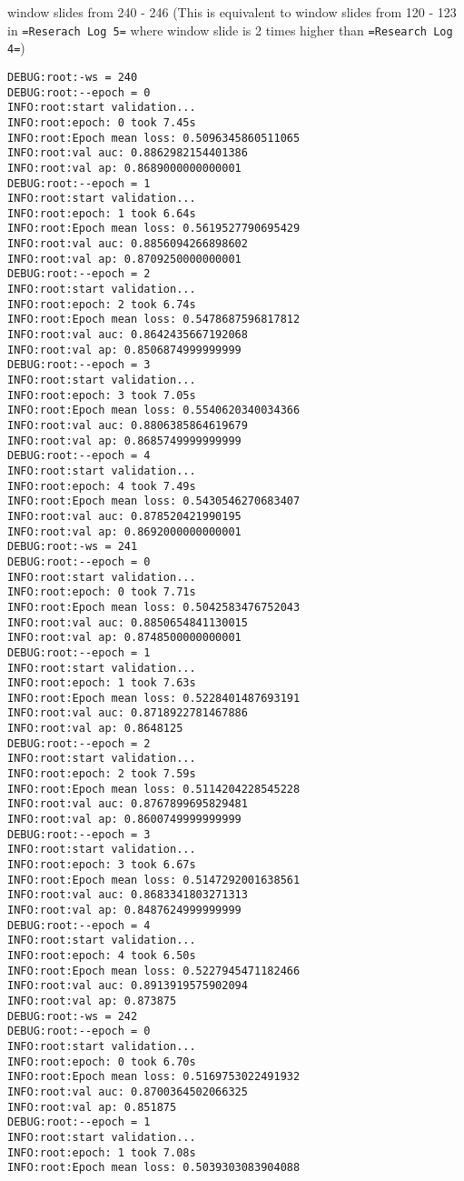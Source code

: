 \documentclass[11pt]{article}
\begin{document}
window slides from 240 - 246 (This is equivalent to window slides from 120 - 123 in \texttt{=Reserach Log 5=} where window slide is 2 times higher than \texttt{=Research Log 4=})
\begin{verbatim}
DEBUG:root:-ws = 240
DEBUG:root:--epoch = 0
INFO:root:start validation...
INFO:root:epoch: 0 took 7.45s
INFO:root:Epoch mean loss: 0.5096345860511065
INFO:root:val auc: 0.8862982154401386
INFO:root:val ap: 0.8689000000000001
DEBUG:root:--epoch = 1
INFO:root:start validation...
INFO:root:epoch: 1 took 6.64s
INFO:root:Epoch mean loss: 0.5619527790695429
INFO:root:val auc: 0.8856094266898602
INFO:root:val ap: 0.8709250000000001
DEBUG:root:--epoch = 2
INFO:root:start validation...
INFO:root:epoch: 2 took 6.74s
INFO:root:Epoch mean loss: 0.5478687596817812
INFO:root:val auc: 0.8642435667192068
INFO:root:val ap: 0.8506874999999999
DEBUG:root:--epoch = 3
INFO:root:start validation...
INFO:root:epoch: 3 took 7.05s
INFO:root:Epoch mean loss: 0.5540620340034366
INFO:root:val auc: 0.8806385864619679
INFO:root:val ap: 0.8685749999999999
DEBUG:root:--epoch = 4
INFO:root:start validation...
INFO:root:epoch: 4 took 7.49s
INFO:root:Epoch mean loss: 0.5430546270683407
INFO:root:val auc: 0.878520421990195
INFO:root:val ap: 0.8692000000000001
DEBUG:root:-ws = 241
DEBUG:root:--epoch = 0
INFO:root:start validation...
INFO:root:epoch: 0 took 7.71s
INFO:root:Epoch mean loss: 0.5042583476752043
INFO:root:val auc: 0.8850654841130015
INFO:root:val ap: 0.8748500000000001
DEBUG:root:--epoch = 1
INFO:root:start validation...
INFO:root:epoch: 1 took 7.63s
INFO:root:Epoch mean loss: 0.5228401487693191
INFO:root:val auc: 0.8718922781467886
INFO:root:val ap: 0.8648125
DEBUG:root:--epoch = 2
INFO:root:start validation...
INFO:root:epoch: 2 took 7.59s
INFO:root:Epoch mean loss: 0.5114204228545228
INFO:root:val auc: 0.8767899695829481
INFO:root:val ap: 0.8600749999999999
DEBUG:root:--epoch = 3
INFO:root:start validation...
INFO:root:epoch: 3 took 6.67s
INFO:root:Epoch mean loss: 0.5147292001638561
INFO:root:val auc: 0.8683341803271313
INFO:root:val ap: 0.8487624999999999
DEBUG:root:--epoch = 4
INFO:root:start validation...
INFO:root:epoch: 4 took 6.50s
INFO:root:Epoch mean loss: 0.5227945471182466
INFO:root:val auc: 0.8913919575902094
INFO:root:val ap: 0.873875
DEBUG:root:-ws = 242
DEBUG:root:--epoch = 0
INFO:root:start validation...
INFO:root:epoch: 0 took 6.70s
INFO:root:Epoch mean loss: 0.5169753022491932
INFO:root:val auc: 0.8700364502066325
INFO:root:val ap: 0.851875
DEBUG:root:--epoch = 1
INFO:root:start validation...
INFO:root:epoch: 1 took 7.08s
INFO:root:Epoch mean loss: 0.5039303083904088

\end{verbatim}
\end{document}
